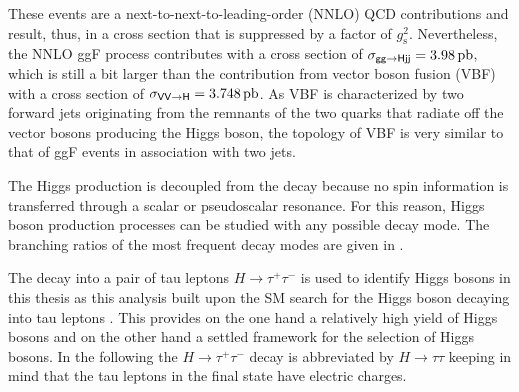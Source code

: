 These events are a next-to-next-to-leading-order (NNLO) QCD contributions and result, thus, in a cross section that is suppressed by a factor of $g_\text{s}^2$. Nevertheless, the NNLO ggF process contributes with a cross section of $\mathsf{\sigma_{gg\rightarrow Hjj}} = \text{3.98\,{pb}}$, which is still a bit larger than
the contribution from vector boson fusion (VBF)  with a cross section of $\mathsf{\sigma_{VV\rightarrow H}} = \text{3.748\,pb}$. As VBF is characterized by two forward jets originating from the remnants of the two quarks that radiate off the
vector bosons producing the Higgs boson, the topology of VBF is very similar to that of ggF events in association with two jets.

The Higgs production is decoupled from the decay because no spin information is transferred through a scalar or pseudoscalar resonance. For this reason, Higgs boson production processes can be studied with any possible decay mode. The branching ratios 
of the most frequent decay modes are given in . 

The decay into a pair of tau leptons $H\rightarrow \tau^+\tau^-$ is used to identify Higgs bosons in this thesis as this analysis built upon the SM search for the Higgs boson decaying into tau leptons \cite{Sirunyan:2017khh}. This provides on the 
one hand a relatively high yield of Higgs bosons  and on the other hand a settled framework for the selection of Higgs bosons. 
In the following the $H\rightarrow \tau^+\tau^-$ decay is abbreviated by $H\rightarrow \tau\tau$ keeping in mind that the tau leptons in the final state have electric charges. 

